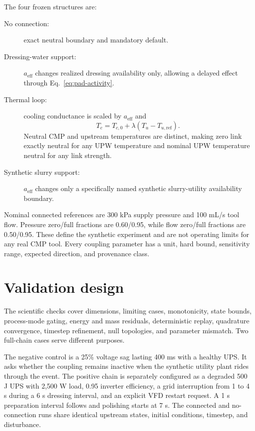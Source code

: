 \documentclass[10pt,twocolumn]{article}
\begin{document}
The four frozen structures are:
\begin{description}
  \item[No connection:] exact neutral boundary and mandatory default.
  \item[Dressing-water support:] $a_{\mathrm{eff}}$ changes realized dressing
  availability only, allowing a delayed effect through Eq.~\eqref{eq:pad-activity}.
  \item[Thermal loop:] cooling conductance is scaled by
  $a_{\mathrm{eff}}$ and
  \begin{equation}
    T_c=T_{c,0}+\lambda(T_u-T_{u,\mathrm{ref}}).
    \label{eq:thermal-map}
  \end{equation}
  Neutral CMP and upstream temperatures are distinct, making zero link exactly
  neutral for any UPW temperature and nominal UPW temperature neutral for any
  link strength.
  \item[Synthetic slurry support:] $a_{\mathrm{eff}}$ changes only a
  specifically named synthetic slurry-utility availability boundary.
\end{description}

Nominal connected references are 300 kPa supply pressure and 100 mL/s tool
flow. Pressure zero/full fractions are 0.60/0.95, while flow zero/full
fractions are 0.50/0.95. These define the synthetic experiment and are not
operating limits for any real CMP tool. Every coupling parameter has a unit,
hard bound, sensitivity range, expected direction, and provenance class.

\section{Validation design}

The scientific checks cover dimensions, limiting cases, monotonicity, state
bounds, process-mode gating, energy and mass residuals, deterministic replay,
quadrature convergence, timestep refinement, null topologies, and parameter
mismatch. Two full-chain cases serve different purposes.

The negative control is a 25\% voltage sag lasting 400 ms with a healthy UPS.
It asks whether the coupling remains inactive when the synthetic utility plant
rides through the event. The positive chain is separately configured as a
degraded 500 J UPS with 2,500 W load, 0.95 inverter efficiency, a grid
interruption from 1 to 4 s during a 6 s dressing interval, and an explicit VFD
restart request. A 1 s preparation interval follows and polishing starts at
7 s. The connected and no-connection runs share identical upstream states,
initial conditions, timestep, and disturbance.
\end{document}
